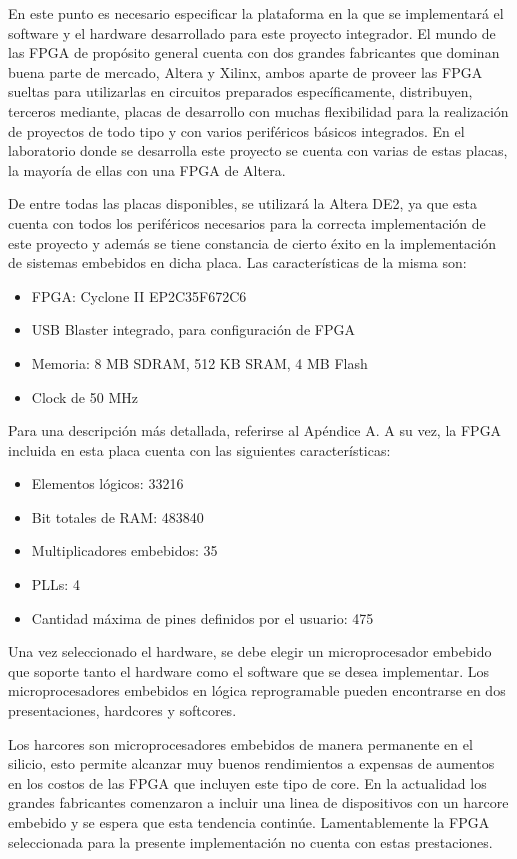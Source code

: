 En este punto es necesario especificar la plataforma en la que se implementará el software y el hardware desarrollado para este proyecto integrador. El mundo de las FPGA de propósito general cuenta con dos grandes fabricantes que dominan buena parte de mercado, Altera y Xilinx, ambos aparte de proveer las FPGA sueltas para utilizarlas en circuitos preparados específicamente, distribuyen, terceros mediante, placas de desarrollo con muchas flexibilidad para la realización de proyectos de todo tipo y con varios periféricos básicos integrados. En el laboratorio donde se desarrolla este proyecto se cuenta con varias de estas placas, la mayoría de ellas con una FPGA de Altera. 

De entre todas las placas disponibles, se utilizará la Altera DE2, ya que esta cuenta con todos los periféricos necesarios para la correcta implementación de este proyecto y además se tiene constancia de cierto éxito en la implementación de sistemas embebidos en dicha placa. Las características de la misma son:

\begin{itemize}
	\item FPGA: Cyclone II EP2C35F672C6
	\item USB Blaster integrado, para configuración de FPGA
	\item Memoria: 8 MB SDRAM, 512 KB SRAM, 4 MB Flash
	\item Clock de 50 MHz
\end{itemize}

Para una descripción más detallada, referirse al Apéndice A. A su vez, la FPGA incluida en esta placa cuenta con las siguientes características:

\begin{itemize}
	\item Elementos lógicos: 33216
	\item Bit totales de RAM: 483840
	\item Multiplicadores embebidos: 35
	\item PLLs: 4
	\item Cantidad máxima de pines definidos por el usuario: 475
\end{itemize}

Una vez seleccionado el hardware, se debe elegir un microprocesador embebido que soporte tanto el hardware como el software que se desea implementar. Los microprocesadores embebidos en lógica reprogramable pueden encontrarse en dos presentaciones, hardcores y softcores.

Los harcores son microprocesadores embebidos de manera permanente en el silicio, esto permite alcanzar muy buenos rendimientos a expensas de aumentos en los costos de las FPGA que incluyen este tipo de core. En la actualidad los grandes fabricantes comenzaron a incluir una linea de dispositivos con un harcore embebido y se espera que esta tendencia continúe. Lamentablemente la FPGA seleccionada para la presente implementación no cuenta con estas prestaciones. 

